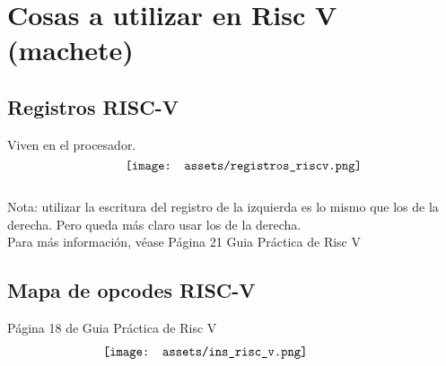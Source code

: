 \documentclass[10pt,a4paper]{article}
\begin{document}
\section*{Cosas a utilizar en Risc V (machete)}
\subsection*{Registros RISC-V}
\label{subsec:registros_riscv}
Viven en el procesador. \\
\[\begin{minipage}[b]{0.5\textwidth}
    \texttt{[image: assets/registros\_riscv.png]}
    \label{fig:registros_riscv}
\end{minipage}\] 
Nota: utilizar la escritura del registro de la izquierda es lo mismo que los de la derecha. Pero queda más claro usar los de la derecha. \\
Para más información, véase Página 21 Guia Práctica de Risc V
\subsection*{Mapa de opcodes RISC-V}
\label{subsec:ins_risc_v}
Página 18 de Guia Práctica de Risc V
\[\begin{minipage}[b]{0.6\textwidth}
    \texttt{[image: assets/ins\_risc\_v.png]}
    \label{fig:ins_risc_v}
\end{minipage}\]
\end{document}
